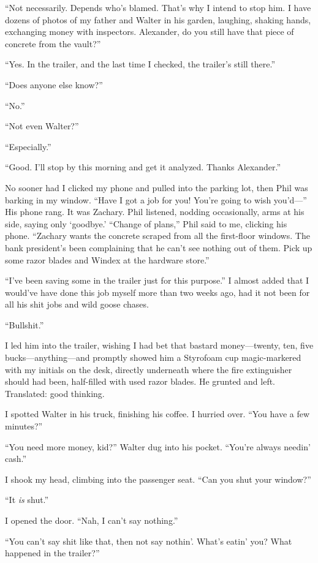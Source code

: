 ``Not necessarily. Depends who's blamed. That's why I intend to stop
him. I have dozens of photos of my father and Walter in his garden,
laughing, shaking hands, exchanging money with inspectors. Alexander, do
you still have that piece of concrete from the vault?''

``Yes. In the trailer, and the last time I checked, the trailer's still
there.''

``Does anyone else know?''

``No.''

``Not even Walter?''

``Especially.''

``Good. I'll stop by this morning and get it analyzed. Thanks
Alexander.''

No sooner had I clicked my phone and pulled into the parking lot, then
Phil was barking in my window. ``Have I got a job for you! You're going
to wish you'd---'' His phone rang. It was Zachary. Phil listened,
nodding occasionally, arms at his side, saying only `goodbye.' ``Change
of plans,'' Phil said to me, clicking his phone. ``Zachary wants the
concrete scraped from all the first-floor windows. The bank president's
been complaining that he can't see nothing out of them. Pick up some
razor blades and Windex at the hardware store.''

``I've been saving some in the trailer just for this purpose.'' I almost
added that I would've have done this job myself more than two weeks ago,
had it not been for all his shit jobs and wild goose chases.

``Bullshit.''

I led him into the trailer, wishing I had bet that bastard
money---twenty, ten, five bucks---anything---and promptly showed him a
Styrofoam cup magic-markered with my initials on the desk, directly
underneath where the fire extinguisher should had been, half-filled with
used razor blades. He grunted and left. Translated: good thinking.

I spotted Walter in his truck, finishing his coffee. I hurried over.
``You have a few minutes?''

``You need more money, kid?'' Walter dug into his pocket. ``You're
always needin' cash.''

I shook my head, climbing into the passenger seat. ``Can you shut your
window?''

``It \emph{is} shut.''

I opened the door. ``Nah, I can't say nothing.''

``You can't say shit like that, then not say nothin'. What's eatin' you?
What happened in the trailer?''

